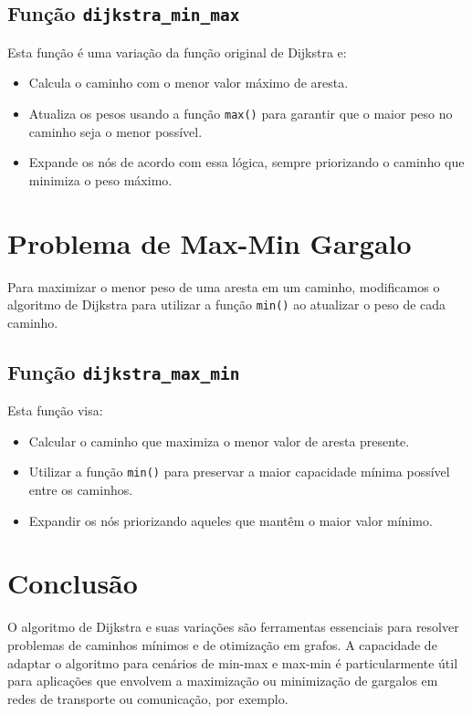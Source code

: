 \documentclass{article}
\begin{document}
\subsection{Função \texttt{dijkstra\_min\_max}}

Esta função é uma variação da função original de Dijkstra e:

\begin{itemize}
    \item Calcula o caminho com o menor valor máximo de aresta.
    \item Atualiza os pesos usando a função \texttt{max()} para garantir que o maior peso no caminho seja o menor possível.
    \item Expande os nós de acordo com essa lógica, sempre priorizando o caminho que minimiza o peso máximo.
\end{itemize}

\section{Problema de Max-Min Gargalo}

Para maximizar o menor peso de uma aresta em um caminho, modificamos o algoritmo de Dijkstra para utilizar a função \texttt{min()} ao atualizar o peso de cada caminho.

\subsection{Função \texttt{dijkstra\_max\_min}}

Esta função visa:

\begin{itemize}
    \item Calcular o caminho que maximiza o menor valor de aresta presente.
    \item Utilizar a função \texttt{min()} para preservar a maior capacidade mínima possível entre os caminhos.
    \item Expandir os nós priorizando aqueles que mantêm o maior valor mínimo.
\end{itemize}

\section{Conclusão}

O algoritmo de Dijkstra e suas variações são ferramentas essenciais para resolver problemas de caminhos mínimos e de otimização em grafos. A capacidade de adaptar o algoritmo para cenários de min-max e max-min é particularmente útil para aplicações que envolvem a maximização ou minimização de gargalos em redes de transporte ou comunicação, por exemplo.
\end{document}
